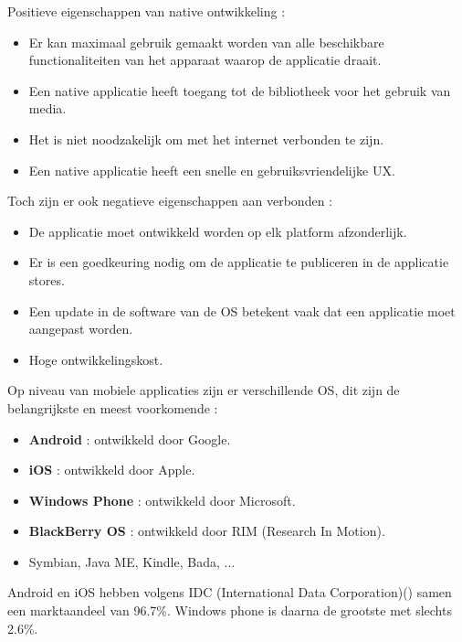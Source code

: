 Positieve eigenschappen van native ontwikkeling : 
\begin{itemize}
\item Er kan maximaal gebruik gemaakt worden van alle beschikbare functionaliteiten van het apparaat waarop de applicatie draait.
\item Een native applicatie heeft toegang tot de bibliotheek voor het gebruik van media.
\item Het is niet noodzakelijk om met het internet verbonden te zijn.
\item Een native applicatie heeft een snelle en gebruiksvriendelijke UX.
\end{itemize}
Toch zijn er ook negatieve eigenschappen aan verbonden : 
\begin{itemize}
\item De applicatie moet ontwikkeld worden op elk platform afzonderlijk.
\item Er is een goedkeuring nodig om de applicatie te publiceren in de applicatie stores.
\item Een update in de software van de OS betekent vaak dat een applicatie moet aangepast worden.
\item Hoge ontwikkelingskost.
\end{itemize}

Op niveau van mobiele applicaties zijn er verschillende OS, dit zijn de belangrijkste en meest voorkomende : 
\begin{itemize}
\item \textbf{Android} : ontwikkeld door Google.
\item \textbf{iOS} : ontwikkeld door Apple.
\item \textbf{Windows Phone} : ontwikkeld door Microsoft.
\item \textbf{BlackBerry OS} : ontwikkeld door RIM (Research In Motion).
\item Symbian, Java ME, Kindle, Bada, ... 
\end{itemize}

Android en iOS hebben volgens IDC (International Data Corporation)() samen een marktaandeel van 96.7\%. Windows phone is daarna de grootste met slechts 2.6\%. \citep{idc:mobile}

